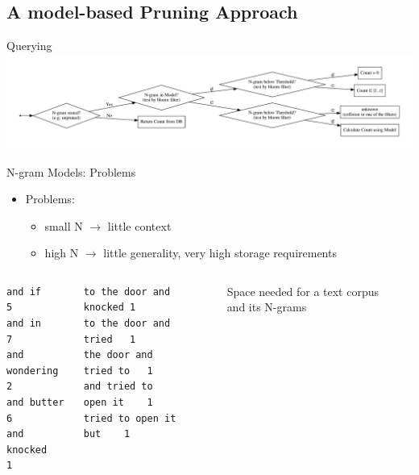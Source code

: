 \documentclass[16:9,en,navbarinfooter]{sdqbeamer}
\begin{document}
\subsection{A model-based Pruning Approach}
\begin{frame}{Querying}
    \includegraphics[width=\textwidth]{Interpretation.pdf}
\end{frame}
\begin{frame}[fragile]{N-gram Models: Problems}
\vspace{1cm}
\begin{itemize}

\item Problems:
\begin{itemize}
\item small N $\rightarrow$ little context
\item high N $\rightarrow$ little generality, very high storage requirements
\end{itemize}
\end{itemize}

\lstset{
frame = single,  
framexleftmargin=1pt}
\begin{columns}

\begin{lstlisting}[title={2-grams.txt}]
and if        5 
and in        7 
and wondering 2
and butter    6
and knocked   1
\end{lstlisting}

\begin{lstlisting}[title={5-grams.txt}]
to the door and knocked 1
to the door and tried   1
the door and tried to   1
and tried to open it    1
tried to open it but    1
\end{lstlisting}
    \begin{figure}[H]
    
        \caption*{Space needed for a text corpus and its N-grams}
    \end{figure}
\end{columns}

\end{frame}
\end{document}
